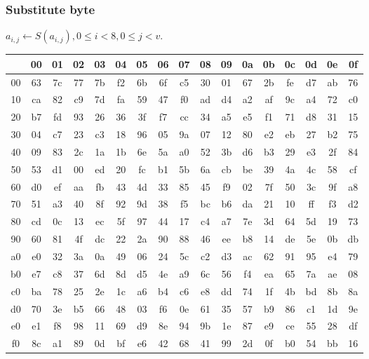 \documentclass{beamer}
\begin{document}
\begin{frame}
\frametitle{Substitute byte}
$a_{i,j} \gets S( a_{i,j}),  0 \leq i < 8, 0 \leq j < v.$ 
\resizebox{\linewidth}{!} {
    \begin{tabular}{ c | *{16}{c}}
     & 00 & 01 & 02 & 03 & 04 & 05 & 06 & 07 & 08 & 09 & 0a & 0b & 0c & 0d & 0e & 0f \\ \hline
  00 & 63 & 7c & 77 & 7b & f2 & 6b & 6f & c5 & 30 & 01 & 67 & 2b & fe & d7 & ab & 76 \\ 
  10 & ca & 82 & c9 & 7d & fa & 59 & 47 & f0 & ad & d4 & a2 & af & 9c & a4 & 72 & c0 \\
  20 & b7 & fd & 93 & 26 & 36 & 3f & f7 & cc & 34 & a5 & e5 & f1 & 71 & d8 & 31 & 15 \\
  30 & 04 & c7 & 23 & c3 & 18 & 96 & 05 & 9a & 07 & 12 & 80 & e2 & eb & 27 & b2 & 75 \\
  40 & 09 & 83 & 2c & 1a & 1b & 6e & 5a & a0 & 52 & 3b & d6 & b3 & 29 & e3 & 2f & 84 \\
  50 & 53 & d1 & 00 & ed & 20 & fc & b1 & 5b & 6a & cb & be & 39 & 4a & 4c & 58 & cf \\
  60 & d0 & ef & aa & fb & 43 & 4d & 33 & 85 & 45 & f9 & 02 & 7f & 50 & 3c & 9f & a8 \\
  70 & 51 & a3 & 40 & 8f & 92 & 9d & 38 & f5 & bc & b6 & da & 21 & 10 & ff & f3 & d2 \\
  80 & cd & 0c & 13 & ec & 5f & 97 & 44 & 17 & c4 & a7 & 7e & 3d & 64 & 5d & 19 & 73 \\
  90 & 60 & 81 & 4f & dc & 22 & 2a & 90 & 88 & 46 & ee & b8 & 14 & de & 5e & 0b & db \\
  a0 & e0 & 32 & 3a & 0a & 49 & 06 & 24 & 5c & c2 & d3 & ac & 62 & 91 & 95 & e4 & 79 \\
  b0 & e7 & c8 & 37 & 6d & 8d & d5 & 4e & a9 & 6c & 56 & f4 & ea & 65 & 7a & ae & 08 \\
  c0 & ba & 78 & 25 & 2e & 1c & a6 & b4 & c6 & e8 & dd & 74 & 1f & 4b & bd & 8b & 8a \\
  d0 & 70 & 3e & b5 & 66 & 48 & 03 & f6 & 0e & 61 & 35 & 57 & b9 & 86 & c1 & 1d & 9e \\
  e0 & e1 & f8 & 98 & 11 & 69 & d9 & 8e & 94 & 9b & 1e & 87 & e9 & ce & 55 & 28 & df \\
  f0 & 8c & a1 & 89 & 0d & bf & e6 & 42 & 68 & 41 & 99 & 2d & 0f & b0 & 54 & bb & 16 \\
  \end{tabular}
  }
\end{frame}
\end{document}

